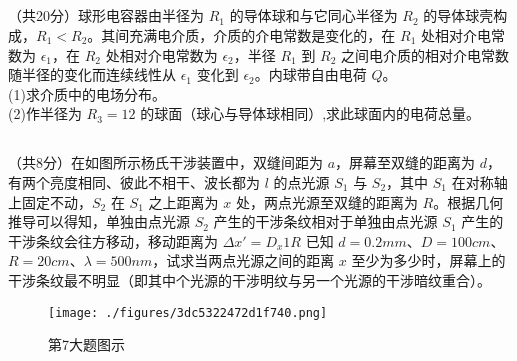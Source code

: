\subsection{ }
（共20分）球形电容器由半径为 $R_1$ 的导体球和与它同心半径为 $R_2$ 的导体球壳构成，$R_1<R_2$。其间充满电介质，介质的介电常数是变化的，在 $R_1$ 处相对介电常数为 $\epsilon_1$，在 $R_2$ 处相对介电常数为 $\epsilon_2$，半径 $R_1$ 到 $R_2$ 之间电介质的相对介电常数随半径的变化而连续线性从 $\epsilon_1$ 变化到 $\epsilon_2$。内球带自由电荷 $Q$。\\
(1)求介质中的电场分布。\\
(2)作半径为 $R_{3}=12$ 的球面（球心与导体球相同）,求此球面内的电荷总量。\\

\subsection{ }
（共8分）在如图所示杨氏干涉装置中，双缝间距为 $a$，屏幕至双缝的距离为 $d$，有两个亮度相同、彼此不相干、波长都为 $l$ 的点光源 $S_1$ 与 $S_2$，其中 $S_1$ 在对称轴上固定不动，$S_2$ 在 $S_1$ 之上距离为 $x$ 处，两点光源至双缝的距离为 $R$。根据几何推导可以得知，单独由点光源 $S_2$ 产生的干涉条纹相对于单独由点光源 $S_1$ 产生的干涉条纹会往方移动，移动距离为 $\Delta x'=D_{x}1R$ 已知 $d=0.2mm$、$D=100cm$、$R=20cm$、$\lambda =500nm$，试求当两点光源之间的距离 $x$ 至少为多少时，屏幕上的干涉条纹最不明显（即其中个光源的干涉明纹与另一个光源的干涉暗纹重合）。\\
\begin{figure}[ht]
\centering
\texttt{[image: ./figures/3dc5322472d1f740.png]}
\caption{第7大题图示} \label{fig_CAS20_4}
\end{figure}
